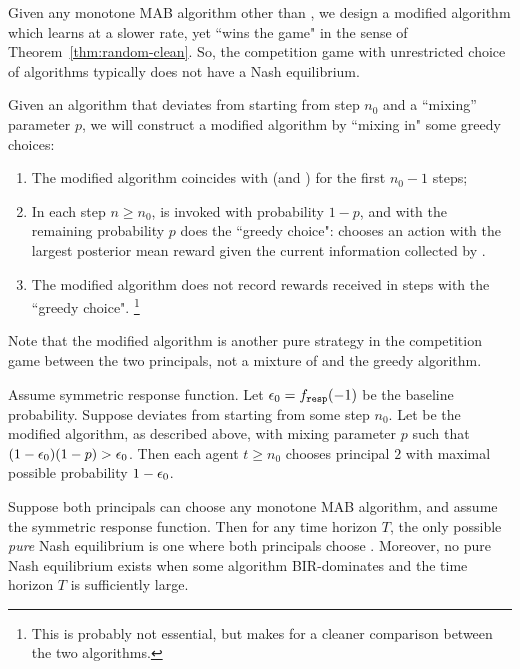 Given any monotone MAB algorithm other than \DynGreedy, we design a modified algorithm which learns at a slower rate, yet ``wins the game" in the sense of Theorem~\ref{thm:random-clean}. So, the competition game with unrestricted choice of algorithms typically does not have a Nash equilibrium.

Given an algorithm \alg[1] that deviates from \DynGreedy starting from
step $n_0$ and a ``mixing'' parameter $p$, we will construct a
modified algorithm by ``mixing in" some greedy choices:
\begin{enumerate}
\item The modified algorithm coincides with \alg[1] (and \DynGreedy)
for the first $n_0-1$ steps;
\item In each step $n\geq n_0$, \alg[1] is invoked with probability
  $1-p$, and with the remaining probability $p$ does the ``greedy
  choice": chooses an action with the largest posterior mean reward
  given the current information collected by \alg[1].

\item The modified algorithm does not record rewards received in steps with the ``greedy choice".%
    \footnote{This is probably not essential, but makes for a cleaner comparison between the two algorithms.}

\end{enumerate}


Note that the modified algorithm is another pure strategy in the competition game between the two principals, not a mixture of \alg[1] and the greedy algorithm.

\begin{theorem}\label{thm:random-greedy}
Assume symmetric \HardMaxRandom response function. Let $\epsilon_0 = f_{\mathtt{resp}}(-1)$ be the baseline probability. Suppose \alg[1] deviates from \DynGreedy starting from some step $n_0$. Let \alg[2] be the modified algorithm, as described above, with mixing parameter $p$ such that
    $(1-\epsilon_0)(1-p)>\epsilon_0$.
Then each agent $t\geq n_0$ chooses principal $2$ with maximal possible probability $1-\epsilon_0$.
\end{theorem}

\begin{corollary}\label{cor:random-greedy}
  Suppose both principals can choose any monotone MAB algorithm, and assume the symmetric \HardMaxRandom response
  function. Then for any time
  horizon $T$, the only possible \emph{pure} Nash equilibrium is one
  where both principals choose \DynGreedy. Moreover, no pure Nash
  equilibrium exists when some algorithm BIR-dominates \DynGreedy and the time horizon $T$ is sufficiently large.
\end{corollary}


